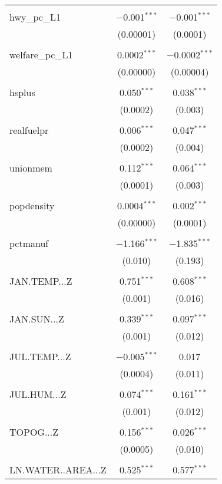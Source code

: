 \begin{table}[!htbp]
\begin{tabular}{@{\extracolsep{5pt}}lcc}
  & & \\ 
 hwy\_pc\_L1 & $-$0.001$^{***}$ & $-$0.001$^{***}$ \\ 
  & (0.00001) & (0.0001) \\ 
  & & \\ 
 welfare\_pc\_L1 & 0.0002$^{***}$ & $-$0.0002$^{***}$ \\ 
  & (0.00000) & (0.00004) \\ 
  & & \\ 
 hsplus & 0.050$^{***}$ & 0.038$^{***}$ \\ 
  & (0.0002) & (0.003) \\ 
  & & \\ 
 realfuelpr & 0.006$^{***}$ & 0.047$^{***}$ \\ 
  & (0.0002) & (0.004) \\ 
  & & \\ 
 unionmem & 0.112$^{***}$ & 0.064$^{***}$ \\ 
  & (0.0001) & (0.003) \\ 
  & & \\ 
 popdensity & 0.0004$^{***}$ & 0.002$^{***}$ \\ 
  & (0.00000) & (0.0001) \\ 
  & & \\ 
 pctmanuf & $-$1.166$^{***}$ & $-$1.835$^{***}$ \\ 
  & (0.010) & (0.193) \\ 
  & & \\ 
 JAN.TEMP...Z & 0.751$^{***}$ & 0.608$^{***}$ \\ 
  & (0.001) & (0.016) \\ 
  & & \\ 
 JAN.SUN...Z & 0.339$^{***}$ & 0.097$^{***}$ \\ 
  & (0.001) & (0.012) \\ 
  & & \\ 
 JUL.TEMP...Z & $-$0.005$^{***}$ & 0.017 \\ 
  & (0.0004) & (0.011) \\ 
  & & \\ 
 JUL.HUM...Z & 0.074$^{***}$ & 0.161$^{***}$ \\ 
  & (0.001) & (0.012) \\ 
  & & \\ 
 TOPOG...Z & 0.156$^{***}$ & 0.026$^{***}$ \\ 
  & (0.0005) & (0.010) \\ 
  & & \\ 
 LN.WATER..AREA...Z & 0.525$^{***}$ & 0.577$^{***}$ \\ 

\end{tabular}
\end{table}

